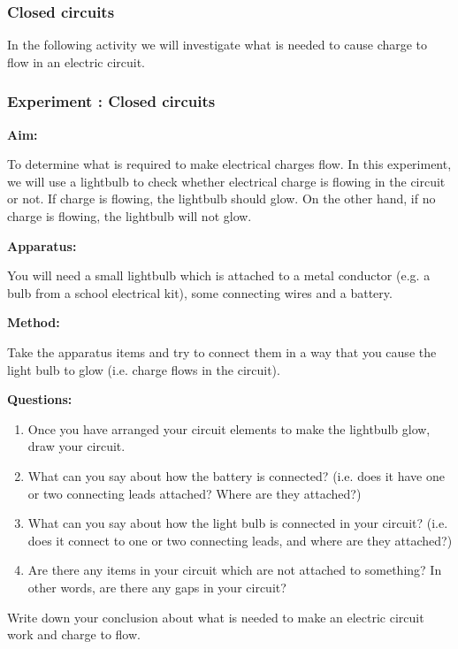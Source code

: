       \label{m38771*uid5}
            \subsubsection{ Closed circuits}
            \nopagebreak
            
        
        \label{m38771*id62637}In the following activity we will investigate what is needed to cause charge to flow in an electric circuit.\par 
\label{m38771*secfhsst!!!underscore!!!id97}
            \subsubsection{ Experiment : Closed circuits }
            \nopagebreak
            \label{m38771*id62648}\noindent{}\textbf{Aim:}
          
To determine what is required to make electrical charges flow.
In this experiment, we will use a lightbulb to check whether electrical charge is flowing in the circuit or not. If charge is flowing, the lightbulb should glow. On the other hand, if no charge is flowing, the lightbulb will not glow.\par 
        \label{m38771*id62665}\noindent{}\textbf{Apparatus:}
          
        You will need a small lightbulb which is attached to a metal conductor (e.g. a bulb from a school electrical kit), some connecting wires and a battery.\par 
        \label{m38771*id62679}\noindent{}\textbf{Method:}
          
        Take the apparatus items and try to connect them in a way that you cause the light bulb to glow (i.e. charge flows in the circuit).\par 
        \label{m38771*id62694}\noindent{}\textbf{Questions:}
          
        \label{m38771*id62702}\begin{enumerate}[noitemsep, label=\textbf{\arabic*}. ] 
            \label{m38771*uid6}\item Once you have arranged your circuit elements to make the lightbulb glow, draw your circuit.
\label{m38771*uid7}\item What can you say about how the battery is connected? (i.e. does it have one or two connecting leads attached? Where are they attached?)
\label{m38771*uid8}\item What can you say about how the light bulb is connected in your circuit? (i.e. does it connect to one or two connecting leads, and where are they attached?)
\label{m38771*uid9}\item Are there any items in your circuit which are not attached to something? In other words, are there any gaps in your circuit?
\end{enumerate}
        \par 
        \label{m38771*id62757}Write down your conclusion about what is needed to make an electric circuit work and charge to flow.
 \par 

